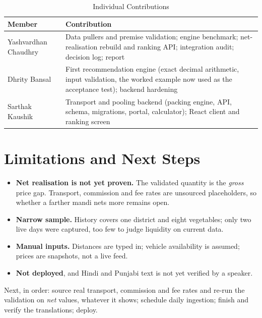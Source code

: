 \documentclass[conference]{IEEEtran}
\begin{document}
\begin{table}[!t]
\caption{Individual Contributions}
\label{tab:team}
\centering
\scriptsize
\setlength{\tabcolsep}{3pt}
\begin{tabular}{>{\raggedright\arraybackslash}p{}
    >{\raggedright\arraybackslash}p{}}
\toprule
\textbf{Member} & \textbf{Contribution}\\
\midrule
Yashvardhan Chaudhry & Data pullers and premise validation; engine benchmark; net-realisation rebuild and ranking API; integration audit; decision log; report\\
Dhrity Bansal & First recommendation engine (exact decimal arithmetic, input validation, the worked example now used as the acceptance test); backend hardening\\
Sarthak Kaushik & Transport and pooling backend (packing engine, API, schema, migrations, portal, calculator); React client and ranking screen\\
\bottomrule
\end{tabular}
\end{table}

\section{Limitations and Next Steps}
\label{sec:limits}
\begin{itemize}
    \item \textbf{Net realisation is not yet proven.} The validated
    quantity is the \emph{gross} price gap. Transport, commission and fee
    rates are unsourced placeholders, so whether a farther mandi nets
    more remains open.
    \item \textbf{Narrow sample.} History covers one district and eight
    vegetables; only two live days were captured, too few to judge
    liquidity on current data.
    \item \textbf{Manual inputs.} Distances are typed in; vehicle
    availability is assumed; prices are snapshots, not a live feed.
    \item \textbf{Not deployed}, and Hindi and Punjabi text is not yet
    verified by a speaker.
\end{itemize}
Next, in order: source real transport, commission and fee rates and re-run
the validation on \emph{net} values, whatever it shows; schedule daily
ingestion; finish and verify the translations; deploy.

\end{document}
